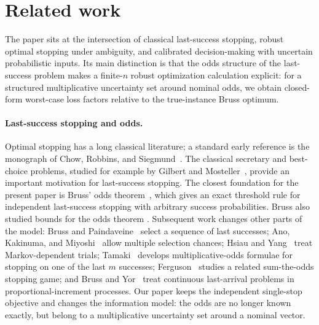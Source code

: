 \documentclass[11pt,a4paper]{article}
\begin{document}
\section{Related work}
\label{sec:related-work}

The paper sits at the intersection of classical last-success stopping, robust
optimal stopping under ambiguity, and calibrated decision-making with uncertain
probabilistic inputs.  Its main distinction is that the odds structure of the
last-success problem makes a finite-\(n\) robust optimization calculation
explicit: for a structured multiplicative uncertainty set around nominal odds,
we obtain closed-form worst-case loss factors relative to the true-instance
Bruss optimum.

\paragraph{Last-success stopping and odds.}
Optimal stopping has a long classical literature; a standard early reference is
the monograph of Chow, Robbins, and Siegmund~\cite{ChowRobbinsSiegmund1971}.
The classical secretary and best-choice problems, studied for example by
Gilbert and Mosteller~\cite{GilbertMosteller1966}, provide an important
motivation for last-success stopping.  The closest foundation for the present
paper is Bruss' odds theorem~\cite{Bruss2000}, which gives an exact threshold
rule for independent last-success stopping with arbitrary success
probabilities.  Bruss also studied bounds for the odds theorem
\cite{Bruss2003}.  Subsequent work changes other parts of the model: Bruss and
Paindaveine~\cite{BrussPaindaveine2000} select a sequence of last successes;
Ano, Kakinuma, and Miyoshi~\cite{AnoKakinumaMiyoshi2010} allow multiple
selection chances; Hsiau and Yang~\cite{HsiauYang2002} treat Markov-dependent
trials; Tamaki~\cite{Tamaki2010} develops multiplicative-odds formulae for
stopping on one of the last \(m\) successes; Ferguson~\cite{Ferguson2016}
  studies a related sum-the-odds stopping game; and Bruss and
  Yor~\cite{BrussYor2012} treat continuous last-arrival problems in
  proportional-increment processes.  Our paper keeps the independent
  single-stop objective and changes the information model: the odds are no
  longer known exactly, but belong to a multiplicative uncertainty set around a
  nominal vector.
\end{document}
